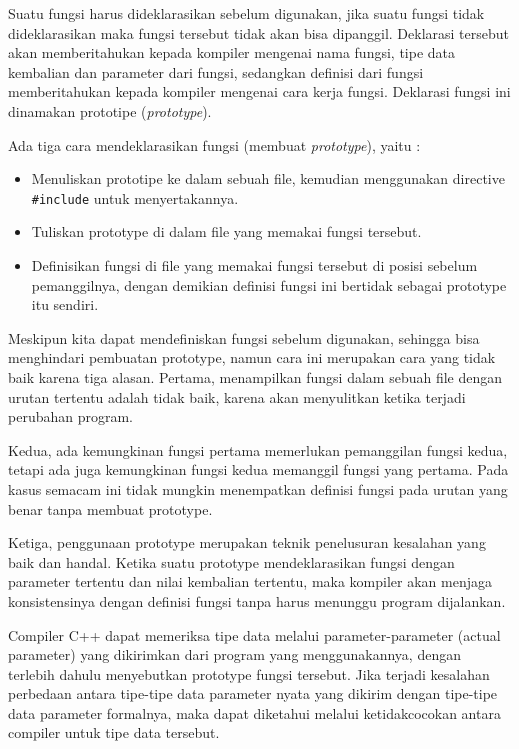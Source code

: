 Suatu fungsi harus dideklarasikan sebelum digunakan, jika suatu fungsi
tidak dideklarasikan maka fungsi tersebut tidak akan bisa dipanggil.
Deklarasi tersebut akan memberitahukan kepada kompiler mengenai nama
fungsi, tipe data kembalian dan parameter dari fungsi, sedangkan
definisi dari fungsi memberitahukan kepada kompiler mengenai cara kerja
fungsi. Deklarasi fungsi ini dinamakan prototipe (\emph{prototype}).

Ada tiga cara mendeklarasikan fungsi (membuat \emph{prototype}), yaitu :

\begin{itemize}

\item
  Menuliskan prototipe ke dalam sebuah file, kemudian menggunakan
  directive \texttt{\#include} untuk menyertakannya.
\item
  Tuliskan prototype di dalam file yang memakai fungsi tersebut.
\item
  Definisikan fungsi di file yang memakai fungsi tersebut di posisi
  sebelum pemanggilnya, dengan demikian definisi fungsi ini bertidak
  sebagai prototype itu sendiri.
\end{itemize}

Meskipun kita dapat mendefiniskan fungsi sebelum digunakan, sehingga
bisa menghindari pembuatan prototype, namun cara ini merupakan cara yang
tidak baik karena tiga alasan. Pertama, menampilkan fungsi dalam sebuah
file dengan urutan tertentu adalah tidak baik, karena akan menyulitkan
ketika terjadi perubahan program.

Kedua, ada kemungkinan fungsi pertama memerlukan pemanggilan fungsi
kedua, tetapi ada juga kemungkinan fungsi kedua memanggil fungsi yang
pertama. Pada kasus semacam ini tidak mungkin menempatkan definisi
fungsi pada urutan yang benar tanpa membuat prototype.

Ketiga, penggunaan prototype merupakan teknik penelusuran kesalahan yang
baik dan handal. Ketika suatu prototype mendeklarasikan fungsi dengan
parameter tertentu dan nilai kembalian tertentu, maka kompiler akan
menjaga konsistensinya dengan definisi fungsi tanpa harus menunggu
program dijalankan.

Compiler C++ dapat memeriksa tipe data melalui parameter-parameter
(actual parameter) yang dikirimkan dari program yang menggunakannya,
dengan terlebih dahulu menyebutkan prototype fungsi tersebut. Jika
terjadi kesalahan perbedaan antara tipe-tipe data parameter nyata yang
dikirim dengan tipe-tipe data parameter formalnya, maka dapat diketahui
melalui ketidakcocokan antara compiler untuk tipe data tersebut.

